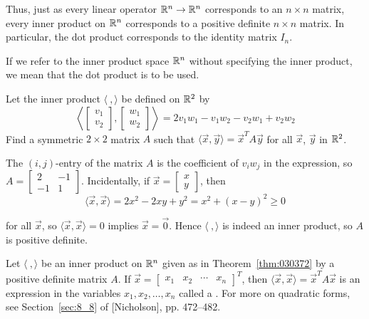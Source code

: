 \documentclass{ximera}
\begin{document}
Thus, just as every linear operator $\mathbb{R}^n \to \mathbb{R}^n$ corresponds to an $n \times n$ matrix, every inner product on $\mathbb{R}^n$ corresponds to a positive definite $n \times n$ matrix. In particular, the dot product corresponds to the identity matrix $I_{n}$.

\begin{remark}
    If we refer to the inner product space $\mathbb{R}^n$ without specifying the inner product, we mean that the dot product is to be used.
\end{remark}

\begin{example}\label{exa:030413}
Let the inner product $\langle\ , \rangle$ be defined on $\mathbb{R}^2$ by
\begin{equation*}
\left \langle
\left[ \begin{array}{c}
v_1 \\
v_2
\end{array} \right], \left[ \begin{array}{c}
w_1 \\
w_2
\end{array} \right]
\right \rangle
= 2v_1w_1 - v_1w_2 - v_2w_1 + v_2w_2
\end{equation*}
Find a symmetric $2 \times 2$ matrix $A$ such that $\langle\vec{x}, \vec{y}\rangle = \vec{x}^{T}A\vec{y}$ for all $\vec{x}$, $\vec{y}$ in $\mathbb{R}^2$.

\begin{explanation}
The $(i, j)$-entry of the matrix $A$ is the coefficient of $v_{i}w_{j}$ in the expression, so
$ A =
\left[ \begin{array}{rr}
2 & -1 \\
-1 & 1
\end{array} \right]$. Incidentally, if
$\vec{x} =
\left[ \begin{array}{r}
x \\
y
\end{array} \right]$, then
\begin{equation*}
\langle \vec{x}, \vec{x} \rangle = 2x^2 - 2xy + y^2 = x^2 +(x - y)^2 \geq 0
\end{equation*}

for all $\vec{x}$, so $\langle\vec{x}, \vec{x}\rangle = 0$ implies
$\vec{x} = \vec{0}$. Hence $\langle\ , \rangle$ is indeed an inner product, so $A$ is positive definite.
\end{explanation}
\end{example}

Let $\langle\ , \rangle$ be an inner product on $\mathbb{R}^n$ given as in Theorem~\ref{thm:030372} by a positive definite matrix $A$. If $\vec{x} =
\left[ \begin{array}{cccc}
x_1 & x_2 & \cdots & x_n
\end{array} \right]^T $, then $\langle\vec{x}, \vec{x}\rangle = \vec{x}^{T}A\vec{x}$ is an expression in the variables
$x_{1}, x_{2}, \dots, x_{n}$ called a . For more on quadratic forms, see Section~\ref{sec:8_8} of [Nicholson], pp. 472--482.
\end{document}

